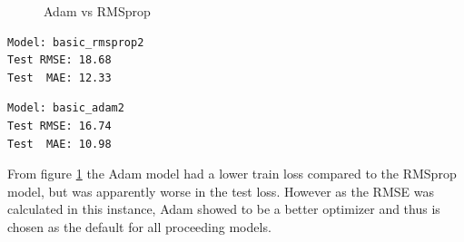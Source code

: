\documentclass[10pt,11pt,12pt,oneside]{book}
\begin{document}
\begin{figure}[H]
    \centering
    \qquad
    \caption{Adam vs RMSprop}%
    \label{fig:basic}%
\end{figure}
\pagebreak
\begin{multicols}{2}
\centering
\begin{verbatim}
Model: basic_rmsprop2
Test RMSE: 18.68
Test  MAE: 12.33
\end{verbatim}
\begin{verbatim}
Model: basic_adam2
Test RMSE: 16.74
Test  MAE: 10.98
\end{verbatim}
\end{multicols}
From figure \ref{fig:basic} the Adam model had a lower train loss compared to the RMSprop model, but was apparently worse in the test loss. However as the RMSE was calculated in this instance, Adam showed to be a better optimizer and thus is chosen as the default for all proceeding models.\\
\end{document}
